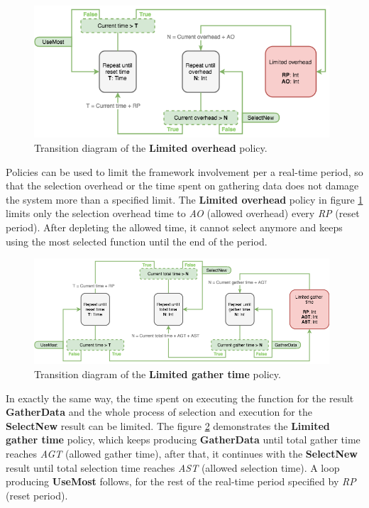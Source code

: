 \begin{figure}[h!]
	\captionsetup{justification=centering,margin=0.5cm}
	\centerline{\mbox{\includegraphics[width=110mm]{./img/limited_overhead.png}}}
	\caption{Transition diagram of the \textbf{Limited overhead} policy.}
	\label{fig:limited_overhead}
\end{figure}

Policies can be used to limit the framework involvement per a real-time period, so that the selection overhead or the time spent on gathering data does not damage the system more than a specified limit. The \textbf{Limited overhead} policy in figure \ref{fig:limited_overhead} limits only the selection overhead time to \textit{AO} (allowed overhead) every \textit{RP} (reset period). After depleting the allowed time, it cannot select anymore and keeps using the most selected function until the end of the period.

\begin{figure}[h!]
	\captionsetup{justification=centering,margin=0.5cm}
	\centerline{\mbox{\includegraphics[width=110mm]{./img/limited_gather_time.png}}}
	\caption{Transition diagram of the \textbf{Limited gather time} policy.}
	\label{fig:limited_gather_time}
\end{figure}

In exactly the same way, the time spent on executing the function for the result \textbf{GatherData} and the whole process of selection and execution for the \textbf{SelectNew} result can be limited. The figure \ref{fig:limited_gather_time} demonstrates the \textbf{Limited gather time} policy, which keeps producing \textbf{GatherData} until total gather time reaches \textit{AGT} (allowed gather time), after that, it continues with the \textbf{SelectNew} result until total selection time reaches \textit{AST} (allowed selection time). A loop producing \textbf{UseMost} follows, for the rest of the real-time period specified by \textit{RP} (reset period).

